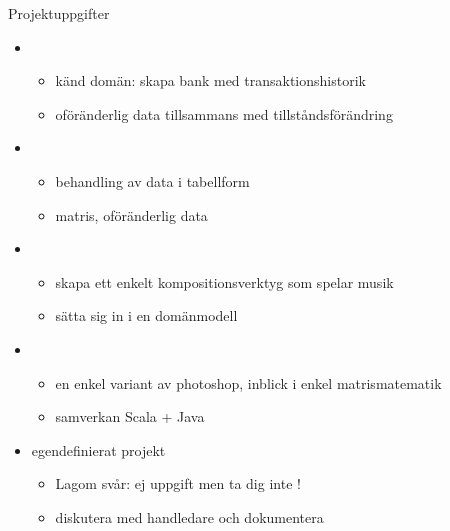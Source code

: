 \begin{SlideExtra}{Projektuppgifter}\SlideFontTiny

\begin{itemize}\SlideFontTiny
\item {}
\begin{itemize}\SlideFontTiny
\item känd domän: skapa bank med transaktionshistorik 
\item oföränderlig data tillsammans med tillståndsförändring
\end{itemize}

\item {}
\begin{itemize}\SlideFontTiny
\item behandling av data i tabellform 
\item matris, oföränderlig data
\end{itemize}

\item {}
\begin{itemize}\SlideFontTiny
\item skapa ett enkelt kompositionsverktyg som spelar musik
\item sätta sig in i en domänmodell
\end{itemize}

\item {} 
\begin{itemize}\SlideFontTiny
\item en enkel variant av photoshop, inblick i enkel matrismatematik
\item samverkan Scala + Java
\end{itemize}


\item egendefinierat projekt 
\begin{itemize}\SlideFontTiny
\item Lagom svår: ej  uppgift men ta dig inte !
\item diskutera med handledare och dokumentera
\end{itemize}


\end{itemize}

\end{SlideExtra}

